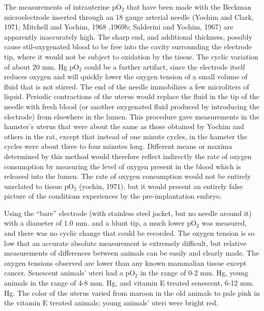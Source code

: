 The measurements of intrauterine pO$_{2}$ that have been made with the Beckman microelectrode inserted through an 18 gauge arterial needle (Yochim and Clark, 1971; Mitchell and Yochim, 1968 ,1969b; Salderini and Yochim, 1967) are apparently inaccurately high. The sharp end, and additional thickness, possibly cause stil-oxygenated blood to be free into the cavity surrounding the electrode tip, where it would not be subject to oxidation by the tissue. The cyclic variation of about 20 mm. Hg pO$_{2}$ could be a further artifact, since the electrode itself reduces oxygen and will quickly lower the oxygen tension of a small volume of fluid that is not stirred. The end of the needle immobilizes a few microliters of liquid. Periodic contractions of the uterus would replace the fluid in the tip of the needle with fresh blood (or another oxygenated fluid produced by introducing the electrode) from elsewhere in the lumen. This procedure gave measurements in the hamster's uterus that were about the same as those obtained by Yochim and others in the rat, except that instead of one minute cycles, in the hamster the cycles were about three to four minutes long. Different means or maxima determined by this method would therefore reflect indirectly the rate of oxygen consumption by measuring the level of oxygen present in the blood which is released into the lumen. The rate of oxygen consumption would not be entirely unrelated to tissue pO$_{2}$ (yochin, 1971), but it would present an entirely false picture of the conditions experiences by the pre-implantation embryo.

Using the ``bare'' electrode (with stainless steel jacket, but no needle around it) with a diameter of 1.0 mm. and a blunt tip, a much lower pO$_{2}$ was measured, and there was no cyclic change that could be recorded. The oxygen tension is so low that an accurate absolute measurement is extremely difficult, but relative measurements of differences between animals can be easily and clearly made. The oxygen tensions observed are lower than any known mammalian tissue except cancer. Senescent animals' uteri had a pO$_{2}$ in the range of 0-2 mm. Hg, young animals in the range of 4-8 mm. Hg, and vitamin E treated senescent, 6-12 mm. Hg. The color of the uterus varied from maroon in the old animals to pale pink in the vitamin E treated animals; young animals' uteri were bright red.

